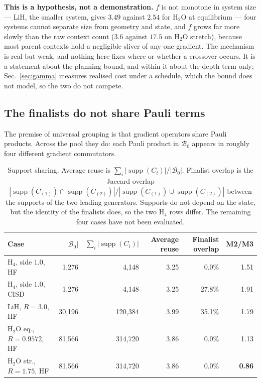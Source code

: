 \documentclass[10pt]{article}
\newcommand{\supp}{\operatorname{supp}}
\begin{document}
\textbf{This is a hypothesis, not a demonstration.} $f$ is not monotone in system size --- LiH, the smaller system, gives $3.49$ against $2.54$ for H$_2$O at equilibrium --- four systems cannot separate size from geometry and state, and $f$ grows far more slowly than the raw context count ($3.6$ against $17.5$ on H$_2$O stretch), because most parent contexts hold a negligible sliver of any one gradient. The mechanism is real but weak, and nothing here fixes where or whether a crossover occurs. It is a statement about the planning bound, and within it about the depth term only; Sec.~\ref{sec:gamma} measures realised cost under a schedule, which the bound does not model, so the two do not compete.

\subsection{The finalists do not share Pauli terms}
\label{sec:overlap}

The premise of universal grouping is that gradient operators share Pauli products. Across the pool they do: each Pauli product in $\mathcal B_0$ appears in roughly four different gradient commutators.

\begin{table}[!htbp]
\centering
\scriptsize
\caption{Support sharing. Average reuse is $\sum_i|\supp(C_i)|/|\mathcal B_0|$. Finalist overlap is the Jaccard overlap $|\supp(C_{(1)})\cap\supp(C_{(2)})|/|\supp(C_{(1)})\cup\supp(C_{(2)})|$ between the supports of the two leading generators. Supports do not depend on the state, but the identity of the finalists does, so the two H$_4$ rows differ. The remaining four cases have not been evaluated.}
\label{tab:overlap}
\begin{tabular}{lrrrrr}
\toprule
Case & $|\mathcal B_0|$ & $\sum_i|\supp(C_i)|$ & Average reuse & Finalist overlap & M2/M3 \\
\midrule
H$_4$, side $1.0$, HF & 1,276 & 4,148 & 3.25 & 0.0\% & 1.51 \\
H$_4$, side $1.0$, CISD & 1,276 & 4,148 & 3.25 & 27.8\% & 1.91 \\
LiH, $R{=}3.0$, HF & 30,196 & 120,384 & 3.99 & 35.1\% & 1.79 \\
H$_2$O eq., $R{=}0.9572$, HF & 81,566 & 314,720 & 3.86 & 0.0\% & 1.13 \\
H$_2$O str., $R{=}1.75$, HF & 81,566 & 314,720 & 3.86 & 0.0\% & \textbf{0.86} \\
\bottomrule
\end{tabular}
\end{table}
\end{document}
